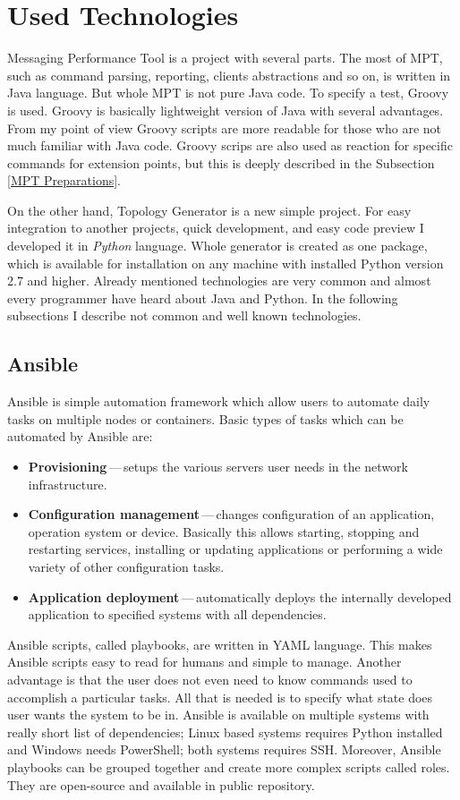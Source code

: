 \section{Used Technologies}
Messaging Performance Tool is a project with several parts. The most of MPT, such as command parsing, reporting, clients abstractions and so on, is written in Java language. But whole MPT is not pure Java code. To specify a test, Groovy is used. Groovy is basically lightweight version of Java with several advantages. From my point of view Groovy scripts are more readable for those who are not much familiar with Java code. Groovy scrips are also used as reaction for specific commands for extension points, but this is deeply described in the Subsection \ref{MPT Preparations}.

On the other hand, Topology Generator is a new simple project. For easy integration to another projects, quick development, and easy code preview I developed it in \emph{Python} language. Whole generator is created as one package, which is available for installation on any machine with installed Python version 2.7 and higher. Already mentioned technologies are very common and almost every programmer have heard about Java and Python. In the following subsections I describe not common and well known technologies.

\subsection{Ansible}
Ansible \cite{Ansible} is simple automation framework which allow users to automate daily tasks on multiple nodes or containers. Basic types of tasks which can be automated by Ansible are:

\begin{itemize}
	\item \textbf{Provisioning}\,---\,setups the various servers user needs in the network infrastructure.
	\item \textbf{Configuration management}\,---\,changes configuration of an application, operation system or device. Basically this allows starting, stopping and restarting services, installing or updating applications or performing a wide variety of other configuration tasks.
	\item \textbf{Application deployment}\,---\,automatically deploys the internally developed application to specified systems with all dependencies.
\end{itemize}

Ansible scripts, called playbooks, are written in YAML language. This makes Ansible scripts easy to read for humans and simple to manage. Another advantage is that the user does not even need to know commands used to accomplish a particular tasks. All that is needed is to specify what state does user wants the system to be in. Ansible is available on multiple systems with really short list of dependencies; Linux based systems requires Python installed and Windows needs PowerShell; both systems requires SSH. Moreover, Ansible playbooks can be grouped together and create more complex scripts called roles. They are open-source and available in public repository.

